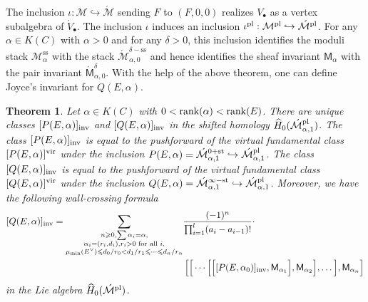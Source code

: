 \documentclass[11pt]{amsart}
\newtheorem{theorem}{Theorem}
\theoremstyle{remark}
\newcommand{\M}{\mathcal{M}}
\newcommand{\Mdash}{\acute{\mathcal{M}}}
\newcommand{\rk}{\textnormal{rank}}
\newcommand{\wh}[1]{\widehat{#1}}
\newcommand{\vir}[0]{\textnormal{vir}}
\newcommand{\inv}[0]{\textnormal{inv}}
\newcommand{\pl}[0]{\textnormal{pl}}
\newcommand{\sfM}{\mathsf M}
\newcommand{\sfMdash}{\acute{\mathsf M}}
\renewcommand{\ss}[0]{\text{ss}}
\newcommand{\st}[0]{\text{st}}
\numberwithin{theorem}{section}
\begin{document}
    The inclusion $\iota : \M \hookrightarrow \Mdash$ sending $F$ to $(F,0,0)$ realizes $V_\bullet$ as a vertex subalgebra of $\acute{V}_\bullet$.
    The inclusion $\iota$ induces an inclusion $\iota^\pl: \M^\pl \hookrightarrow \Mdash^\pl$.
    For any $\alpha \in K(C)$ with $\alpha>0$
    and for any $\delta >0$, this inclusion
    identifies the moduli stack $\M^{\ss}_\alpha$ with the stack $\Mdash^{\delta-\ss}_{\alpha,0}$ and 
    hence identifies the sheaf invariant $\sfM_\alpha$ with the pair invariant $\sfMdash^\delta_{\alpha,0}$.
    With the help of the above theorem, one can define Joyce's invariant for $Q(E,\alpha)$.
    \begin{theorem}\label{theorem quot invariant}
        Let $\alpha \in K(C)$ with $0<\rk(\alpha)< \rk(E)$. 
        There are unique classes $[P(E,\alpha)]_\inv$ and $[Q(E,\alpha)]_\inv$ in the shifted homology 
        $\wh H_0(\Mdash_{\alpha,1}^{\pl})$.
        The class $[P(E,\alpha)]_\inv$ is equal to the pushforward of the virtual fundamental class $[P(E,\alpha)]^\vir$ under the inclusion $P(E,\alpha) = \Mdash^{0+\st}_{\alpha,1} \hookrightarrow \Mdash^\pl_{\alpha,1}$.
        The class $[Q(E,\alpha)]_\inv$ is equal to the pushforward of the virtual fundamental class $[Q(E,\alpha)]^\vir$ under the inclusion $Q(E,\alpha) = \Mdash^{\infty-\st}_{\alpha,1} \hookrightarrow \Mdash^\pl_{\alpha,1}$.
        Moreover, we have the following wall-crossing formula
        \begin{align}\label{equation wall crossing from quot to pair}
             \nonumber   [Q{(E,\alpha)}]_\inv
                = \sum_{\substack{n \geqslant 0, \sum \alpha_i = \alpha, \\ 
                \alpha_i=(r_i,d_i), r_i>0 \text{ for all }i,\\
                \mu_{\min}(E^\vee)\leqslant d_0/r_0<d_1/r_1\leqslant\cdots\leqslant d_n/r_n}}
                & \frac{(-1)^{n}}{\prod_{i=1}^l (a_i - a_{i-1})!} \cdot \\ & 
                \left[\Big[ \cdots \Big[\Big[[P(E,\alpha_0)]_\inv,\sfM_{\alpha_1} \Big], \sfM_{\alpha_2} \Big],\dots \Big],\sfM_{\alpha_n}\right]
            \end{align}
            in the Lie algebra $\wh H_{0}(\Mdash^{\pl})$.
        \end{theorem}
\end{document}
